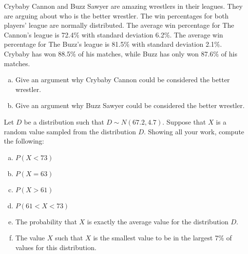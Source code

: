 \documentclass[11pt,letterpaper]{article}
\begin{document}

 Crybaby Cannon and Buzz Sawyer are amazing wrestlers in their leagues. They are arguing about who is the better wrestler. The win percentages for both players' league are normally distributed. The average win percentage for The Cannon's league is 72.4\% with standard deviation 6.2\%. The average win percentage for The Buzz's league is 81.5\% with standard deviation 2.1\%. Crybaby has won 88.5\% of his matches, while Buzz has only won 87.6\% of his matches. 
	\begin{enumerate}[(a)]
	\item Give an argument why Crybaby Cannon could be considered the better wrestler. 
	\item Give an argument why Buzz Sawyer could be considered the better wrestler.
	\end{enumerate}



\newpage



 Let $D$ be a distribution such that $D \sim N(67.2, 4.7)$. Suppose that $X$ is a random value sampled from the distribution $D$. Showing all your work, compute the following:
	\begin{enumerate}[(a)]
	\item $P(X < 73)$
	\item $P(X= 63)$
	\item $P(X > 61)$
	\item $P(61 < X < 73)$
	\item The probability that $X$ is exactly the average value for the distribution $D$. 
	\item The value $X$ such that $X$ is the smallest value to be in the largest 7\% of values for this distribution. 
	\end{enumerate} 
\end{document}
